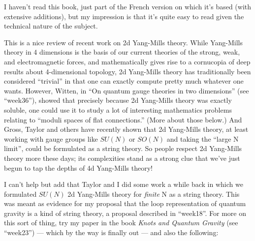 \documentclass{article}
\def\tightlist{}
\renewcommand{\texttt}[1]{%
  \begingroup
  \ttfamily
  \begingroup\lccode`~=`/\lowercase{\endgroup\def~}{/\discretionary{}{}{}}%
  \begingroup\lccode`~=`[\lowercase{\endgroup\def~}{[\discretionary{}{}{}}%
  \begingroup\lccode`~=`.\lowercase{\endgroup\def~}{.\discretionary{}{}{}}%
  \catcode`/=\active\catcode`[=\active\catcode`.=\active
  \scantokens{#1\noexpand}%
  \endgroup
}
\begin{document}
I haven't read this book, just part of the French version on which it's
based (with extensive additions), but my impression is that it's quite
easy to read given the technical nature of the subject.


This is a nice review of recent work on 2d Yang-Mills theory. While
Yang-Mills theory in 4 dimensions is the basis of our current theories
of the strong, weak, and electromagnetic forces, and mathematically
gives rise to a cornucopia of deep results about 4-dimensional topology,
2d Yang-Mills theory has traditionally been considered ``trivial'' in
that one can exactly compute pretty much whatever one wants. However,
Witten, in ``On quantum gauge theories in two dimensions'' (see
``week36''), showed that precisely because 2d Yang-Mills theory was
exactly soluble, one could use it to study a lot of interesting
mathematics problems relating to ``moduli spaces of flat connections.''
(More about those below.) And Gross, Taylor and others have recently
shown that 2d Yang-Mills theory, at least working with gauge groups like
\(SU(N)\) or \(SO(N)\) and taking the ``large N limit'', could be
formulated as a string theory. So people respect 2d Yang-Mills theory
more these days; its complexities stand as a strong clue that we've just
begun to tap the depths of 4d Yang-Mills theory!

I can't help but add that Taylor and I did some work a while back in
which we formulated \(SU(N)\) 2d Yang-Mills theory for \emph{finite} N
as a string theory. This was meant as evidence for my proposal that the
loop representation of quantum gravity is a kind of string theory, a
proposal described in ``week18''. For more on this sort of thing, try my
paper in the book \emph{Knots and Quantum Gravity} (see ``week23'') ---
which by the way is finally out --- and also the following:

\end{document}
